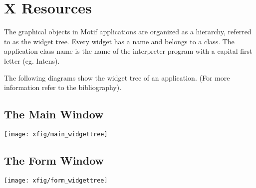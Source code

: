 \newpage
\section{X Resources}
\label{sec:x-resources}
The graphical objects in Motif applications are organized as a hierarchy,
referred to as the widget tree. Every widget has a name and belongs
to a class. The application class name is the name of the
interpreter program with a capital first letter (eg. Intens).

The following diagrams show the widget tree of an \INTENS{}
application. (For more information refer to the bibliography).
\subsection{The Main Window}

\texttt{[image: xfig/main\_widgettree]}

\subsection{The Form Window}
\vspace{2cm}

\texttt{[image: xfig/form\_widgettree]}
\newpage
